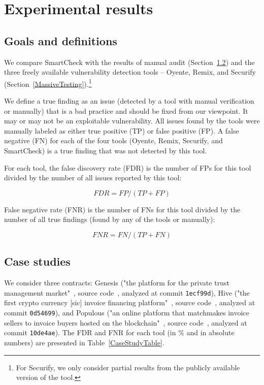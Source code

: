 \section{Experimental results} \label{SectionResults}

\subsection{Goals and definitions}

We compare SmartCheck with the results of manual audit (Section~\ref{ManualAudit}) and the three freely available vulnerability detection tools -- Oyente, Remix, and Securify (Section~\ref{MassiveTesting}).\footnote{For Securify, we only consider partial results from the publicly available version of the tool.}

We define a true finding as an issue (detected by a tool with manual verification or manually) that is a bad practice and should be fixed from our viewpoint.
It may or may not be an exploitable vulnerability.
All issues found by the tools were manually labeled as either true positive (TP) or false positive (FP).
A false negative (FN) for each of the four tools (Oyente, Remix, Securify, and SmartCheck) is a true finding that was not detected by this tool.

For each tool, the false discovery rate (FDR) is the number of FPs for this tool divided by the number of all issues reported by this tool:

\[FDR = FP / (TP + FP)\]

False negative rate (FNR) is the number of FNs for this tool divided by the number of all true findings (found by any of the tools or manually):

\[FNR = FN / (TP + FN)\]


\subsection{Case studies} \label{ManualAudit}

We consider three contracts: Genesis ("the platform for the private trust management market"~\cite{Genesis}, source code~\cite{GenesisGithub}, analyzed at commit \texttt{1ecf99d}), Hive ("the first crypto currency [sic] invoice financing platform"~\cite{Hive}, source code~\cite{HiveGithub}, analyzed at commit \texttt{0d54699}), and Populous ("an online platform that matchmakes invoice sellers to invoice buyers hosted on the blockchain"~\cite{Populous}, source code~\cite{PopulousGithub}, analyzed at commit \texttt{10de4ae}).
The FDR and FNR for each tool (in \% and in absolute numbers) are presented in Table~\ref{CaseStudyTable}.

